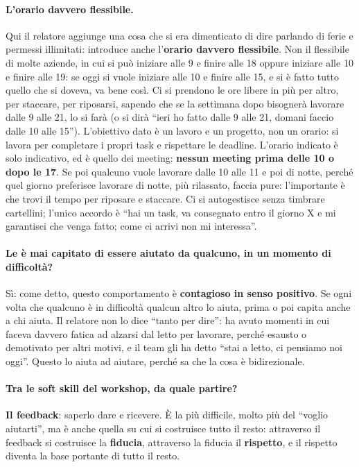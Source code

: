 \paragraph{L'orario davvero flessibile.} Qui il relatore aggiunge una cosa che si era dimenticato di
dire parlando di ferie e permessi illimitati: introduce anche l'\textbf{orario davvero
flessibile}. Non il flessibile di molte aziende, in cui si può iniziare alle 9 e finire alle 18
oppure iniziare alle 10 e finire alle 19: se oggi si vuole iniziare alle 10 e finire alle 15, e si è
fatto tutto quello che si doveva, va bene così. Ci si prendono le ore libere in più per altro, per
staccare, per riposarsi, sapendo che se la settimana dopo bisognerà lavorare dalle 9 alle 21, lo si
farà (o si dirà ``ieri ho fatto dalle 9 alle 21, domani faccio dalle 10 alle 15''). L'obiettivo dato
è un lavoro e un progetto, non un orario: si lavora per completare i propri task e rispettare le
deadline. L'orario indicato è solo indicativo, ed è quello dei meeting: \textbf{nessun meeting prima
delle 10 o dopo le 17}. Se poi qualcuno vuole lavorare dalle 10 alle 11 e poi di notte, perché quel
giorno preferisce lavorare di notte, più rilassato, faccia pure: l'importante è che trovi il tempo per
riposare e staccare. Ci si autogestisce senza timbrare cartellini; l'unico accordo è ``hai un task, va
consegnato entro il giorno X e mi garantisci che venga fatto; come ci arrivi non mi interessa''.

\paragraph{Le è mai capitato di essere aiutato da qualcuno, in un momento di difficoltà?} Sì: come
detto, questo comportamento è \textbf{contagioso in senso positivo}. Se ogni volta che qualcuno è in
difficoltà qualcun altro lo aiuta, prima o poi capita anche a chi aiuta. Il relatore non lo dice
``tanto per dire'': ha avuto momenti in cui faceva davvero fatica ad alzarsi dal letto per lavorare,
perché esausto o demotivato per altri motivi, e il team gli ha detto ``stai a letto, ci pensiamo noi
oggi''. Questo lo aiuta ad aiutare, perché sa che la cosa è bidirezionale.

\paragraph{Tra le soft skill del workshop, da quale partire?} \textbf{Il feedback}: saperlo dare e
ricevere. È la più difficile, molto più del ``voglio aiutarti'', ma è anche quella su cui si costruisce
tutto il resto: attraverso il feedback si costruisce la \textbf{fiducia}, attraverso la fiducia il
\textbf{rispetto}, e il rispetto diventa la base portante di tutto il resto.


